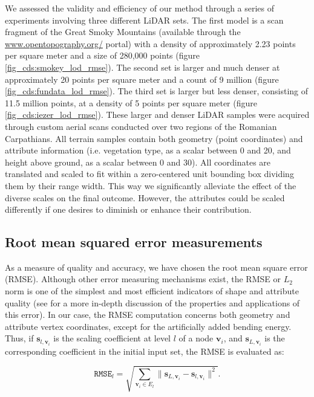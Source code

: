 \documentclass[graybox]{svmult}
\begin{document}
We assessed the validity and efficiency of our method through a series of experiments involving three different LiDAR sets. The first model is a scan fragment of the Great Smoky Mountains (available through the {\url{www.opentopography.org/}} portal) with a density of approximately 2.23 points per square meter and a size of 280,000 points (figure \ref{fig_cds:smokey_lod_rmse}).  The second set is larger and much denser at approximately 20 points per square meter and a count of 9 million (figure \ref{fig_cds:fundata_lod_rmse}). 
The third set is larger but less denser, consisting of 11.5 million points, at a density of 5 points per square meter (figure \ref{fig_cds:iezer_lod_rmse}). These larger and denser LiDAR samples were acquired through custom aerial scans conducted over two regions of the Romanian Carpathians. All terrain samples contain both geometry (point coordinates) and attribute information (i.e. vegetation type, as a scalar between 0 and 20, and height above ground, as a scalar between 0 and 30).
All coordinates are translated and scaled to fit within a zero-centered unit bounding box dividing them by their range width. This way we significantly alleviate the effect of the diverse scales
on the final outcome. However, the attributes could be scaled
differently if one desires to diminish or enhance their contribution.

\subsection{Root mean squared error measurements}

As a measure of quality and accuracy, we have chosen the root mean square error (RMSE). Although other error measuring mechanisms exist, the RMSE or $L_2$ norm is one of the simplest and most efficient indicators of shape and attribute quality (see\cite{Payan2006} for a more in-depth discussion of the properties and applications of this error). In our case, the RMSE computation concerns both geometry and attribute vertex coordinates, except for the artificially added bending energy. Thus, if $\mathbf{s}_{l,\mathbf{v}_i}$ is the scaling coefficient at level $l$ of a node $\mathbf{v}_i$, and $\mathbf{s}_{L,\mathbf{v}_i}$ is the corresponding coefficient in the initial input set, the RMSE is evaluated as:

\begin{equation}
\mathtt{RMSE}_l = \sqrt{\sum_{\mathbf{v}_i \in E_l}{ \| \mathbf{s}_{L,\mathbf{v}_i} - \mathbf{s}_{l,\mathbf{v}_i } \|^2 } } .
\label{eq_cds:RMSE}
\end{equation}
\end{document}
